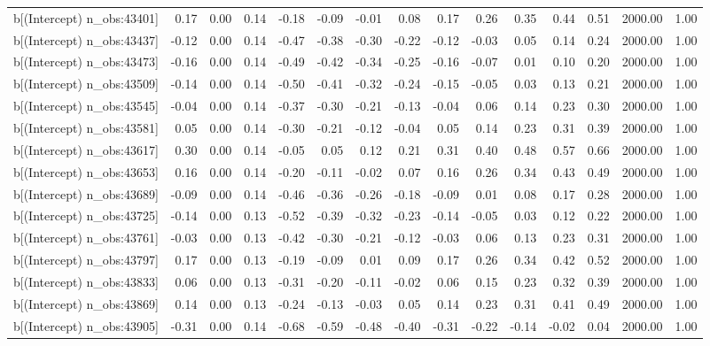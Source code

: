 \begin{table}[ht]
\begin{tabular}{rrrrrrrrrrrrrrr}
  b[(Intercept) n\_obs:43401] & 0.17 & 0.00 & 0.14 & -0.18 & -0.09 & -0.01 & 0.08 & 0.17 & 0.26 & 0.35 & 0.44 & 0.51 & 2000.00 & 1.00 \\ 
  b[(Intercept) n\_obs:43437] & -0.12 & 0.00 & 0.14 & -0.47 & -0.38 & -0.30 & -0.22 & -0.12 & -0.03 & 0.05 & 0.14 & 0.24 & 2000.00 & 1.00 \\ 
  b[(Intercept) n\_obs:43473] & -0.16 & 0.00 & 0.14 & -0.49 & -0.42 & -0.34 & -0.25 & -0.16 & -0.07 & 0.01 & 0.10 & 0.20 & 2000.00 & 1.00 \\ 
  b[(Intercept) n\_obs:43509] & -0.14 & 0.00 & 0.14 & -0.50 & -0.41 & -0.32 & -0.24 & -0.15 & -0.05 & 0.03 & 0.13 & 0.21 & 2000.00 & 1.00 \\ 
  b[(Intercept) n\_obs:43545] & -0.04 & 0.00 & 0.14 & -0.37 & -0.30 & -0.21 & -0.13 & -0.04 & 0.06 & 0.14 & 0.23 & 0.30 & 2000.00 & 1.00 \\ 
  b[(Intercept) n\_obs:43581] & 0.05 & 0.00 & 0.14 & -0.30 & -0.21 & -0.12 & -0.04 & 0.05 & 0.14 & 0.23 & 0.31 & 0.39 & 2000.00 & 1.00 \\ 
  b[(Intercept) n\_obs:43617] & 0.30 & 0.00 & 0.14 & -0.05 & 0.05 & 0.12 & 0.21 & 0.31 & 0.40 & 0.48 & 0.57 & 0.66 & 2000.00 & 1.00 \\ 
  b[(Intercept) n\_obs:43653] & 0.16 & 0.00 & 0.14 & -0.20 & -0.11 & -0.02 & 0.07 & 0.16 & 0.26 & 0.34 & 0.43 & 0.49 & 2000.00 & 1.00 \\ 
  b[(Intercept) n\_obs:43689] & -0.09 & 0.00 & 0.14 & -0.46 & -0.36 & -0.26 & -0.18 & -0.09 & 0.01 & 0.08 & 0.17 & 0.28 & 2000.00 & 1.00 \\ 
  b[(Intercept) n\_obs:43725] & -0.14 & 0.00 & 0.13 & -0.52 & -0.39 & -0.32 & -0.23 & -0.14 & -0.05 & 0.03 & 0.12 & 0.22 & 2000.00 & 1.00 \\ 
  b[(Intercept) n\_obs:43761] & -0.03 & 0.00 & 0.13 & -0.42 & -0.30 & -0.21 & -0.12 & -0.03 & 0.06 & 0.13 & 0.23 & 0.31 & 2000.00 & 1.00 \\ 
  b[(Intercept) n\_obs:43797] & 0.17 & 0.00 & 0.13 & -0.19 & -0.09 & 0.01 & 0.09 & 0.17 & 0.26 & 0.34 & 0.42 & 0.52 & 2000.00 & 1.00 \\ 
  b[(Intercept) n\_obs:43833] & 0.06 & 0.00 & 0.13 & -0.31 & -0.20 & -0.11 & -0.02 & 0.06 & 0.15 & 0.23 & 0.32 & 0.39 & 2000.00 & 1.00 \\ 
  b[(Intercept) n\_obs:43869] & 0.14 & 0.00 & 0.13 & -0.24 & -0.13 & -0.03 & 0.05 & 0.14 & 0.23 & 0.31 & 0.41 & 0.49 & 2000.00 & 1.00 \\ 
  b[(Intercept) n\_obs:43905] & -0.31 & 0.00 & 0.14 & -0.68 & -0.59 & -0.48 & -0.40 & -0.31 & -0.22 & -0.14 & -0.02 & 0.04 & 2000.00 & 1.00 \\ 

\end{tabular}
\end{table}
